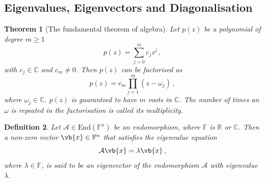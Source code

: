 \documentclass{article}
\theoremstyle{plain}\theoremheaderfont{\normalfont\itshape}\theorembodyfont{\rmfamily}\theoremseparator{.}\newtheorem*{rem}{Remark}\newtheorem*{ex}{Example}\newtheorem*{proof}{Proof}\newtheorem*{altp}{Alternative proof}
\theoremstyle{plain}\theoremheaderfont{\normalfont\bfseries}\theorembodyfont{\rmfamily}\theoremseparator{.}\newtheorem{thm}{Theorem}[section]\newtheorem{lem}[thm]{Lemma}\newtheorem{prop}[thm]{Proposition}\newtheorem*{cor}{Corollary}\newtheorem{defn}[thm]{Definition}\newtheorem{clm}[thm]{Claim}\newtheorem{clminproof}{Claim}
\theoremstyle{break}\theoremheaderfont{\normalfont\itshape}\theorembodyfont{\rmfamily}\theoremseparator{.\medskip}\newtheorem*{proofskip}{Proof}\newtheorem*{exs}{Examples}\newtheorem*{rems}{Remarks}
\theoremstyle{break}\theoremheaderfont{\normalfont\bfseries}\theorembodyfont{\rmfamily}\theoremseparator{.\medskip}\newtheorem{lemskip}[thm]{Lemma}\newtheorem{defnskip}[thm]{Definition}\newtheorem{propskip}[thm]{Proposition}\newtheorem{thmskip}[thm]{Theorem}
\numberwithin{equation}{section}
\begin{document}
	\subsection{Eigenvalues, Eigenvectors and Diagonalisation}
	\begin{thm}[The fundamental theorem of algebra]
		Let \(p(z)\) be a polynomial of degree \(m\ge 1\)
		\[p(z)=\sum_{j=0}^{m}c_j z^j\,,\]
		with \(c_j\in\mathbb{C}\) and \(c_m\ne 0\). Then \(p(z)\) can be factorised as
		\[p(z)=c_m\prod_{j=1}^{m}(z-\omega_j)\,,\]
		where \(\omega_j\in\mathbb{C}\). \(p(z)\) is guaranteed to have \(m\) roots in \(\mathbb{C}\). The number of times an \(\omega\) is repeated in the factorisation is called its \textit{multiplicity}.	
	\end{thm}
	\begin{defn}
		Let \(\mathcal{A}\in\mathrm{End}(\mathbb{F}^n)\) be an endomorphism, where \(\mathbb{F}\) is \(\mathbb{R}\) or \(\mathbb{C}\). Then a non-zero vector \(\vb{x}\in\mathbb{F}^n\) that satisfies the \textit{eigenvalue equation}
		\[\mathcal{A}\vb{x}=\lambda\vb{x}\,,\]
		where \(\lambda\in\mathbb{F}\), is said to be an \textit{eigenvector} of the endomorphism \(\mathcal{A}\) with \textit{eigenvalue} \(\lambda\).
	\end{defn}
	
\end{document}
